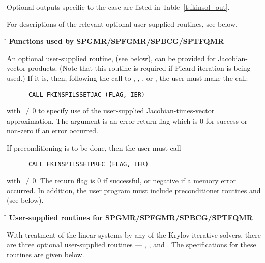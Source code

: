 \begin{Steps}
  Optional outputs specific to the {\sptfqmr} case are listed in
  Table~\ref{t:fkinsol_out}.

  For descriptions of the relevant optional user-supplied routines, see below.


  {\s}{\p}{\h} {\bf Functions used by SPGMR/SPFGMR/SPBCG/SPTFQMR}

  An optional user-supplied routine,  (see below), can be provided for
  Jacobian-vector products.  
  (Note that this routine is required if Picard iteration is being used.)
  If it is, then, following the call to
  , , , or , the user must make the call:
\begin{verbatim}
      CALL FKINSPILSSETJAC (FLAG, IER)
\end{verbatim}
  with  $\neq 0$ to specify use of the user-supplied
  Jacobian-times-vector approximation.
  The argument  is an error return flag which is $0$ 
  for success or non-zero if an error occurred.
  
  If preconditioning is to be done, then the user must call
\begin{verbatim}
      CALL FKINSPILSSETPREC (FLAG, IER)
\end{verbatim}
  with  $\neq 0$.  The return flag  is 0 if
  successful, or negative if a memory error occurred.
  In addition, the user program must include
  preconditioner routines  and  (see below).


 {\s}{\p}{\h} {\bf User-supplied routines for SPGMR/SPFGMR/SPBCG/SPTFQMR}

  With treatment of the linear systems by any of the Krylov iterative
  solvers, there are three optional user-supplied routines ---
  , , and .  The specifications
  for these routines are given below.


\end{Steps}
